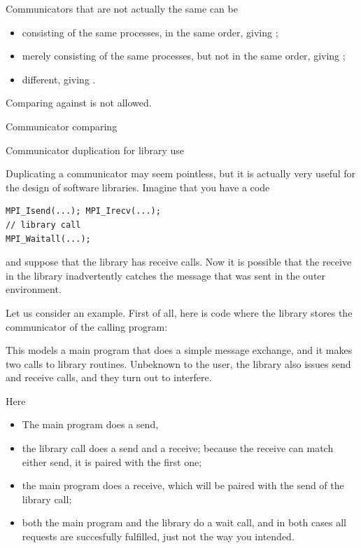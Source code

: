Communicators that are not actually the same can be
\begin{itemize}
\item consisting of the same processes, in the same order,
  giving ;
\item merely consisting of the same processes, but not in the same order,
  giving ;
\item different, giving .
\end{itemize}

Comparing against  is not allowed.

\begin{mplnote}{Communicator comparing}
\end{mplnote}

 {Communicator duplication for library use}
\label{sec:mpi-comm-dup-lib}

Duplicating a communicator may seem pointless, but it is actually very useful for the design of
software libraries. Imagine that you have a code
\lstset{language=C}
\begin{lstlisting}
MPI_Isend(...); MPI_Irecv(...);
// library call
MPI_Waitall(...);
\end{lstlisting}
and suppose that the library has receive calls. Now it is possible that the 
receive in the library inadvertently
catches the message that was sent in the outer environment.

Let us consider an example.
First of all, here is code where the library stores the communicator
of the calling program:
%

This models a main program that does a simple message exchange, and it
makes two calls to library routines. Unbeknown to the user, the
library also issues send and receive calls, and they turn out to
interfere.

Here
\begin{itemize}
\item The main program does a send,
\item the library call  does a send and a receive;
  because the receive can match either send, it is paired with the
  first one;
\item the main program does a receive, which will be paired with the send of the 
  library call;
\item both the main program and the library do a wait call, and in
  both cases all requests are succesfully fulfilled, just not the way
  you intended.
\end{itemize}

